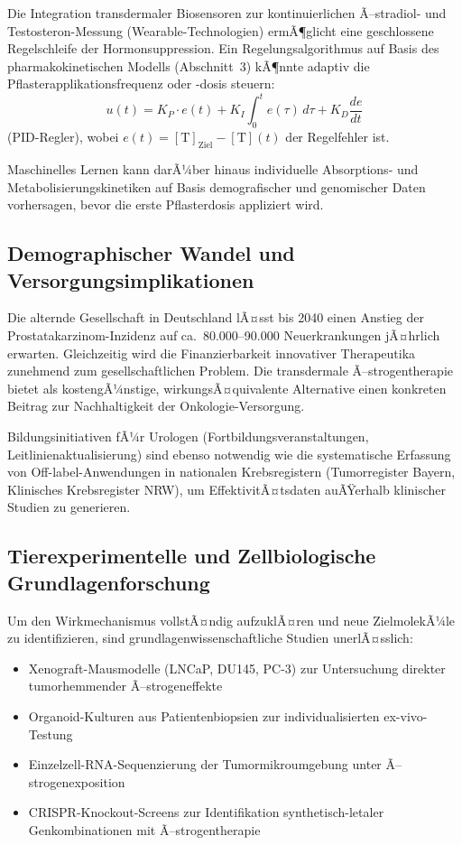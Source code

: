 ﻿\documentclass[a4paper,12pt]{article}
\theoremstyle{definition}
\begin{document}
Die Integration transdermaler Biosensoren zur kontinuierlichen Ã–stradiol- und Testosteron-Messung (Wearable-Technologien) ermÃ¶glicht eine geschlossene Regelschleife der Hormonsuppression.
Ein Regelungsalgorithmus auf Basis des pharmakokinetischen Modells (Abschnitt~3) kÃ¶nnte adaptiv die Pflasterapplikationsfrequenz oder -dosis steuern:
\begin{equation}
  u(t) = K_P \cdot e(t) + K_I \int_0^t e(\tau)\,d\tau + K_D \frac{de}{dt}
\end{equation}
(PID-Regler), wobei $e(t) = [\mathrm{T}]_{\mathrm{Ziel}} - [\mathrm{T}](t)$ der Regelfehler ist.

Maschinelles Lernen kann darÃ¼ber hinaus individuelle Absorptions- und Metabolisierungskinetiken auf Basis demografischer und genomischer Daten vorhersagen, bevor die erste Pflasterdosis appliziert wird.

\subsection{Demographischer Wandel und Versorgungsimplikationen}

Die alternde Gesellschaft in Deutschland lÃ¤sst bis 2040 einen Anstieg der Prostatakarzinom-Inzidenz auf ca.\ 80.000--90.000 Neuerkrankungen jÃ¤hrlich erwarten.
Gleichzeitig wird die Finanzierbarkeit innovativer Therapeutika zunehmend zum gesellschaftlichen Problem.
Die transdermale Ã–strogentherapie bietet als kostengÃ¼nstige, wirkungsÃ¤quivalente Alternative einen konkreten Beitrag zur Nachhaltigkeit der Onkologie-Versorgung.

Bildungsinitiativen fÃ¼r Urologen (Fortbildungsveranstaltungen, Leitlinienaktualisierung) sind ebenso notwendig wie die systematische Erfassung von Off-label-Anwendungen in nationalen Krebsregistern (Tumorregister Bayern, Klinisches Krebsregister NRW), um EffektivitÃ¤tsdaten auÃŸerhalb klinischer Studien zu generieren.

\subsection{Tierexperimentelle und Zellbiologische Grundlagenforschung}

Um den Wirkmechanismus vollstÃ¤ndig aufzuklÃ¤ren und neue ZielmolekÃ¼le zu identifizieren, sind grundlagenwissenschaftliche Studien unerlÃ¤sslich:
\begin{itemize}
  \item Xenograft-Mausmodelle (LNCaP, DU145, PC-3) zur Untersuchung direkter tumorhemmender Ã–strogeneffekte
  \item Organoid-Kulturen aus Patientenbiopsien zur individualisierten ex-vivo-Testung
  \item Einzelzell-RNA-Sequenzierung der Tumormikroumgebung unter Ã–strogenexposition
  \item CRISPR-Knockout-Screens zur Identifikation synthetisch-letaler Genkombinationen mit Ã–strogentherapie
\end{itemize}
\end{document}
